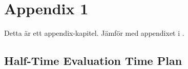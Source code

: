 \chapter{Appendix 1}\label{cha:appendix1}


Detta är ett appendix-kapitel.  Jämför med appendixet i .



\section{Half-Time Evaluation Time Plan}